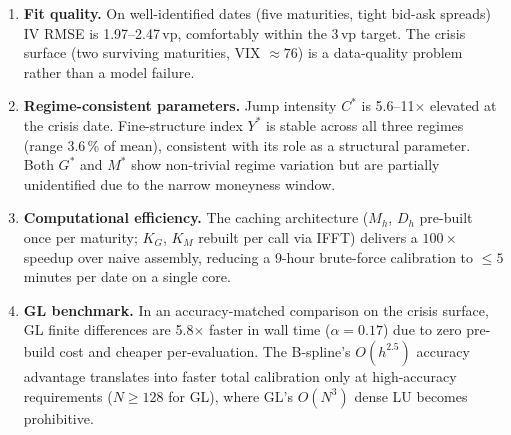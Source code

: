 \documentclass[11pt,a4paper]{article}
\begin{document}
\begin{enumerate}[leftmargin=*, label=\textbf{\arabic*.}]

\item \textbf{Fit quality.}
  On well-identified dates (five maturities, tight bid-ask spreads)
  IV RMSE is 1.97--2.47\,vp, comfortably within the 3\,vp target.
  The crisis surface (two surviving maturities, VIX $\approx 76$) is a
  data-quality problem rather than a model failure.

\item \textbf{Regime-consistent parameters.}
  Jump intensity $C^*$ is 5.6--11$\times$ elevated at the crisis date.
  Fine-structure index $Y^*$ is stable across all three regimes
  (range 3.6\,\% of mean), consistent with its role as a structural
  parameter.  Both $G^*$ and $M^*$ show non-trivial regime variation
  but are partially unidentified due to the narrow moneyness window.

\item \textbf{Computational efficiency.}
  The caching architecture ($M_h$, $D_h$ pre-built once per maturity;
  $K_G$, $K_M$ rebuilt per call via IFFT) delivers a $100\times$ speedup
  over naive assembly, reducing a 9-hour brute-force calibration to
  $\le 5$ minutes per date on a single core.

\item \textbf{GL benchmark.}
  In an accuracy-matched comparison on the crisis surface, GL finite
  differences are 5.8$\times$ faster in wall time ($\alpha = 0.17$)
  due to zero pre-build cost and cheaper per-evaluation.
  The B-spline's $O(h^{2.5})$ accuracy advantage translates into faster
  total calibration only at high-accuracy requirements ($N \ge 128$
  for GL), where GL's $O(N^3)$ dense LU becomes prohibitive.

\end{enumerate}
\end{document}
